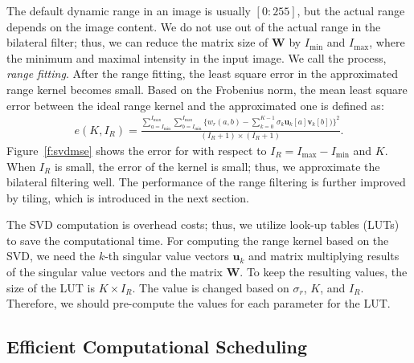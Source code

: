 \documentclass{article}
\begin{document}
The default dynamic range in an image is usually $[0:255]$, but the actual range depends on the image content.
We do not use out of the actual range in the bilateral filter; thus, we can reduce the matrix size of $\bm{W}$ by $I_{\min}$ and $I_{\max}$, where the minimum and maximal intensity in the input image.
We call the process, \textit{range fitting}.
After the range fitting, the least square error in the approximated range kernel becomes small.
Based on the Frobenius norm, the mean least square error between the ideal range kernel and the approximated one is defined as:
\vspace{-1mm}
{
\small
\begin{align}
e(K,\!I_{R}) \!=\!\! \frac{\sum_{a=I_{\min}}^{I_{\max}}\!\sum_{b=I_{\min}}^{I_{\max}}\{ w_{r}(a,\!b) \!-\! \sum _{k=0}^{K-1} \sigma_{k} \bm{u}_{k}[a]\bm{v}_{k}[b]) \}^2}{(I_{R}+1)\times (I_{R}+1)}.
\end{align}
}
Figure~\ref{f:svdmse} shows the error for with respect to $I_R = I_{\max}-I_{\min}$ and $K$.
When $I_R$ is small, the error of the kernel is small; thus, we approximate the bilateral filtering well.
The performance of the range filtering is further improved by tiling, which is introduced in the next section.

The SVD computation is overhead costs; thus, we utilize look-up tables (LUTs) to save the computational time.
For computing the range kernel based on the SVD, we need the $k$-th singular value vectors $\bm{u}_k$ and matrix multiplying results of the singular value vectors and the matrix $\bm{W}$.
To keep the resulting values, the size of the LUT is $K \times I_R$.
The value is changed based on $\sigma_r$, $K$, and $I_R$.
Therefore, we should pre-compute the values for each parameter for the LUT.


\subsection{Efficient Computational Scheduling}
\end{document}
